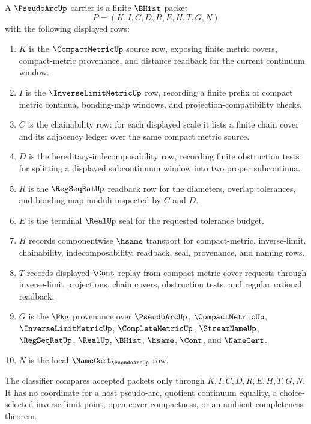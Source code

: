 \begin{definition}
\label{def:pseudo-arc-carrier}
A $\PseudoArcUp$ carrier is a finite $\BHist$ packet
$$
P=(K,I,C,D,R,E,H,T,G,N)
$$
with the following displayed rows:
\begin{enumerate}
\item $K$ is the $\CompactMetricUp$ source row, exposing finite metric covers, compact-metric provenance, and distance readback for the current continuum window.
\item $I$ is the $\InverseLimitMetricUp$ row, recording a finite prefix of compact metric continua, bonding-map windows, and projection-compatibility checks.
\item $C$ is the chainability row: for each displayed scale it lists a finite chain cover and its adjacency ledger over the same compact metric source.
\item $D$ is the hereditary-indecomposability row, recording finite obstruction tests for splitting a displayed subcontinuum window into two proper subcontinua.
\item $R$ is the $\RegSeqRatUp$ readback row for the diameters, overlap tolerances, and bonding-map moduli inspected by $C$ and $D$.
\item $E$ is the terminal $\RealUp$ seal for the requested tolerance budget.
\item $H$ records componentwise $\hsame$ transport for compact-metric, inverse-limit, chainability, indecomposability, readback, seal, provenance, and naming rows.
\item $T$ records displayed $\Cont$ replay from compact-metric cover requests through inverse-limit projections, chain covers, obstruction tests, and regular rational readback.
\item $G$ is the $\Pkg$ provenance over $\PseudoArcUp$, $\CompactMetricUp$, $\InverseLimitMetricUp$, $\CompleteMetricUp$, $\StreamNameUp$, $\RegSeqRatUp$, $\RealUp$, $\BHist$, $\hsame$, $\Cont$, and $\NameCert$.
\item $N$ is the local $\NameCert_{\PseudoArcUp}$ row.
\end{enumerate}
The classifier compares accepted packets only through $K,I,C,D,R,E,H,T,G,N$. It has no coordinate for a host pseudo-arc, quotient continuum equality, a choice-selected inverse-limit point, open-cover compactness, or an ambient completeness theorem.
\end{definition}

